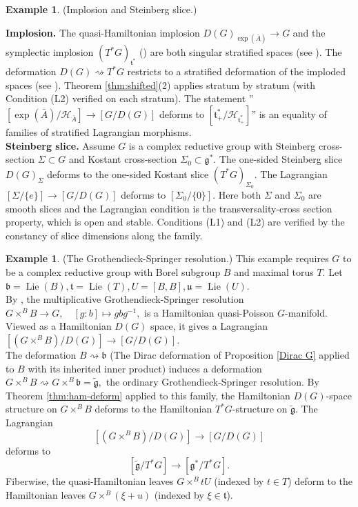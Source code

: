 \documentclass[reqno]{amsart}
\theoremstyle{plain}
\theoremstyle{definition}
\newtheorem{Exp}[Thm]{Example}
\renewcommand{\H}{\mathcal{H}}
\newcommand{\g}{\mathfrak{g}}
\newcommand{\too}{\longrightarrow}
\newcommand{\mtoo}{\longmapsto}
\renewcommand{\t}{\mathfrak{t}}
\newcommand{\Lie}{\operatorname{Lie}}
\begin{document}
\begin{Exp}(Implosion and Steinberg slice.) 


\noindent\textbf{Implosion.} The quasi-Hamiltonian implosion $D(G)_{\exp(\bar{A})} \too G$ and the symplectic implosion $(T^{*}G)_{\t^{*}}$ (\cite[Example 3.8(1)]{bualibanu2026reduction}) are both singular stratified spaces (see \cite{guillemin2002symplectic,hurtubise2006group}). The deformation $D(G) \rightsquigarrow T^{*}G$ restricts to a stratified deformation of the imploded spaces (see \cite{maiza2026multiplicative}). Theorem \ref{thm:shifted}(2) applies stratum by stratum (with Condition (L2) verified on each stratum). The statement ''$[\exp(\bar{A})/\H_{\bar{A}}] \too [G/D(G)]$ deforms to $[\t^{*}_{+}/\H_{\t^{*}_{+}}]$'' is an equality of families of stratified Lagrangian morphisms.\\


\noindent\textbf{Steinberg slice.} Assume $G$ is a complex reductive group with Steinberg cross-section $\Sigma \subset G$ and Kostant cross-section $\Sigma_0 \subset \g^{*}.$ The one-sided Steinberg slice $D(G)_{\Sigma}$ deforms to the one-sided Kostant slice $(T^{*}G)_{\Sigma_0}.$ The Lagrangian $[\Sigma/\{e\}]\too [G/D(G)]$ deforms to $[\Sigma_{0}/\{0\}].$ Here both $\Sigma$ and $\Sigma_0$ are smooth slices and the Lagrangian condition is the transversality-cross section property, which is open and stable. Conditions (L1) and (L2) are verified by the constancy of slice dimensions along the family.
\end{Exp}

\begin{Exp}(The Grothendieck-Springer resolution.)
This example requires $G$ to be a complex reductive group with Borel subgroup $B$ and maximal torus $T.$ Let $\mathfrak{b} = \Lie(B), \t = \Lie(T), U = [B,B], \mathfrak{u} = \Lie(U).$ \\ By \cite[Example 4.8]{bualibanu2026reduction}, the multiplicative Grothendieck-Springer resolution $G \times^{B} B \too G, \quad [g:b] \mtoo gbg^{-1},$ is a Hamiltonian quasi-Poisson $G$-manifold. Viewed as a Hamiltonian $D(G)$ space, it gives a Lagrangian $[(G \times^{B}B)/D(G)] \too [G/D(G)].$\\
The deformation $B \rightsquigarrow \mathfrak{b}$ (The Dirac deformation of Proposition \ref{Dirac G} applied to $B$ with its inherited inner product) induces a deformation $G\times^{B} B \rightsquigarrow G\times^{B} \mathfrak{b} = \tilde{\g},$ the ordinary Grothendieck-Springer resolution. By Theorem \ref{thm:ham-deform} applied to this family, the Hamiltonian $D(G)$-space structure on $G\times^{B} B$ deforms to the Hamiltonian $T^{*}G$-structure on $\tilde{\g}.$ The Lagrangian \[
[(G\times^{B}B)/D(G)] \too [G/D(G)]
\]
deforms to 
\[
[\tilde{\g}/T^{*}G] \too [\g^{*}/T^{*}G].
\]
Fiberwise, the quasi-Hamiltonian leaves $G\times^{B} tU$ (indexed by $t\in T$) deform to the Hamiltonian leaves $G \times^{B}(\xi + u)$ (indexed by $\xi \in \t$).
\end{Exp}



\end{document}
